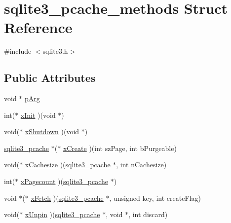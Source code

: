 \hypertarget{structsqlite3__pcache__methods}{}\section{sqlite3\+\_\+pcache\+\_\+methods Struct Reference}
\label{structsqlite3__pcache__methods}


{\ttfamily \#include $<$sqlite3.\+h$>$}

\subsection*{Public Attributes}
\begin{DoxyCompactItemize}
\item 
void $\ast$ \mbox{\hyperlink{structsqlite3__pcache__methods_ac71a23fce5a94ac9bc6babdbbaf1b5b4}{p\+Arg}}
\item 
int($\ast$ \mbox{\hyperlink{structsqlite3__pcache__methods_ac75d3dbf840e6f05ea08d35ad0457fb2}{x\+Init}} )(void $\ast$)
\item 
void($\ast$ \mbox{\hyperlink{structsqlite3__pcache__methods_aa2835c25fac454b7ee7cfd9e625700d7}{x\+Shutdown}} )(void $\ast$)
\item 
\mbox{\hyperlink{sqlite3_8h_a096c453d937d51f7926d7d31c8e0bd2f}{sqlite3\+\_\+pcache}} $\ast$($\ast$ \mbox{\hyperlink{structsqlite3__pcache__methods_ac903d0438a7a1554c818b4c17585e790}{x\+Create}} )(int sz\+Page, int b\+Purgeable)
\item 
void($\ast$ \mbox{\hyperlink{structsqlite3__pcache__methods_ac9ccbed1bea2a902906bfeaa6a330b40}{x\+Cachesize}} )(\mbox{\hyperlink{sqlite3_8h_a096c453d937d51f7926d7d31c8e0bd2f}{sqlite3\+\_\+pcache}} $\ast$, int n\+Cachesize)
\item 
int($\ast$ \mbox{\hyperlink{structsqlite3__pcache__methods_a1e0895008a701c1843336f0e0dcd3f46}{x\+Pagecount}} )(\mbox{\hyperlink{sqlite3_8h_a096c453d937d51f7926d7d31c8e0bd2f}{sqlite3\+\_\+pcache}} $\ast$)
\item 
void $\ast$($\ast$ \mbox{\hyperlink{structsqlite3__pcache__methods_ae09b8ed29c2dd77157f26a69255fd482}{x\+Fetch}} )(\mbox{\hyperlink{sqlite3_8h_a096c453d937d51f7926d7d31c8e0bd2f}{sqlite3\+\_\+pcache}} $\ast$, unsigned key, int create\+Flag)
\item 
void($\ast$ \mbox{\hyperlink{structsqlite3__pcache__methods_a2aa1aefc301a0fe4998ed8397b028630}{x\+Unpin}} )(\mbox{\hyperlink{sqlite3_8h_a096c453d937d51f7926d7d31c8e0bd2f}{sqlite3\+\_\+pcache}} $\ast$, void $\ast$, int discard)

\end{DoxyCompactItemize}
